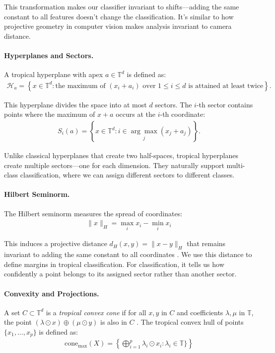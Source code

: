 \documentclass{article}
\newcommand{\trop}{\mathbb{T}}
\begin{document}
This transformation makes our classifier invariant to shifts—adding the same constant to all features doesn't change the classification. It's similar to how projective geometry in computer vision makes analysis invariant to camera distance.

\paragraph{Hyperplanes and Sectors.}
A tropical hyperplane with apex $a \in \trop^d$ is defined as:
\begin{align}
\mathcal{H}_a = \left\{ x \in \trop^d : \text{the maximum of }(x_i + a_i)\text{ over $1\leq i\leq d$ is attained at least twice} \right\}.
\end{align}

This hyperplane divides the space into at most $d$ sectors. The $i$-th sector contains points where the maximum of $x + a$ occurs at the $i$-th coordinate:
\begin{align}
S_i(a) = \left\{x \in \trop^d : i \in \underset{j}{\arg\max} (x_j + a_j)\right\}.
\end{align}

Unlike classical hyperplanes that create two half-spaces, tropical hyperplanes create multiple sectors—one for each dimension. They naturally support multi-class classification, where we can assign different sectors to different classes.

\paragraph{Hilbert Seminorm.}
The Hilbert seminorm measures the spread of coordinates:
\begin{align}
\|x\|_H = \max_i x_i - \min_i x_i
\end{align}

This induces a projective distance $d_H(x,y) = \|x - y\|_H$ that remains invariant to adding the same constant to all coordinates \cite{cohen2004}. We use this distance to define margins in tropical classification. For classification, it tells us how confidently a point belongs to its assigned sector rather than another sector.

\paragraph{Convexity and Projections.}
A set $C \subset \trop^d$ is a \emph{tropical convex cone} if for all $x,y$ in $C$ and coefficients $\lambda,\mu$ in $\trop$,
the point $(\lambda \odot x) \oplus (\mu \odot y)$ is also in $C$ \cite{cohen2004,develin2004}.
The tropical convex hull of points $\{x_1,\ldots,x_p\}$ is defined as:
\begin{align}
  \text{cone}_{\max}(X) = \left\{\bigoplus_{i=1}^p \lambda_i \odot x_i : \lambda_i \in \trop\} \right\}
\end{align}
\end{document}
